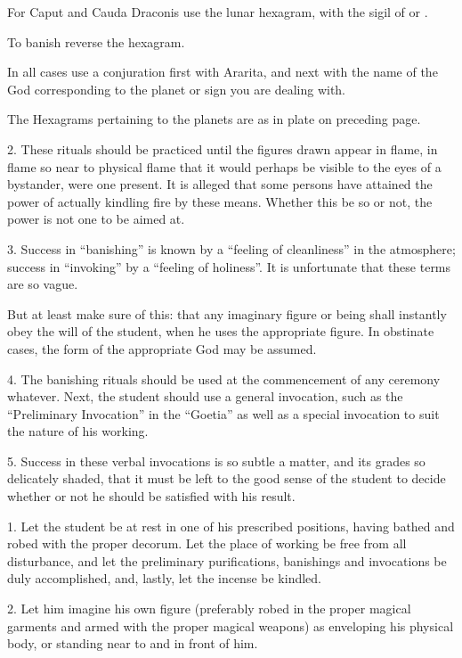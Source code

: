 For Caput and Cauda Draconis use the lunar hexagram, with the sigil of \rahu{} or \rahur{}.

To banish reverse the hexagram.

In all cases use a conjuration first with Ararita, and next with the name of the God corresponding to the planet or sign you are dealing with.

The Hexagrams pertaining to the planets are as in plate on preceding page.

2. These rituals should be practiced until the figures drawn appear in flame, in flame so near to physical flame that it would perhaps be visible to the eyes of a bystander, were one present. It is alleged that some persons have attained the power of actually kindling fire by these means. Whether this be so or not, the power is not one to be aimed at.

3. Success in \enquote{banishing} is known by a \enquote{feeling of cleanliness} in the atmosphere; success in \enquote{invoking} by a \enquote{feeling of holiness}. It is unfortunate that these terms are so vague.

But at least make sure of this: that any imaginary figure or being shall instantly obey the will of the student, when he uses the appropriate figure. In obstinate cases, the form of the appropriate God may be assumed.

4. The banishing rituals should be used at the commencement of any ceremony whatever. Next, the student should use a general invocation, such as the \enquote{Preliminary Invocation} in the \enquote{Goetia} as well as a special invocation to suit the nature of his working.

5. Success in these verbal invocations is so subtle a matter, and its grades so delicately shaded, that it must be left to the good sense of the student to decide whether or not he should be satisfied with his result.


1. Let the student be at rest in one of his prescribed positions, having bathed and robed with the proper decorum. Let the place of working be free from all disturbance, and let the preliminary purifications, banishings and invocations be duly accomplished, and, lastly, let the incense be kindled.

2. Let him imagine his own figure (preferably robed in the proper magical garments and armed with the proper magical weapons) as enveloping his physical body, or standing near to and in front of him.

